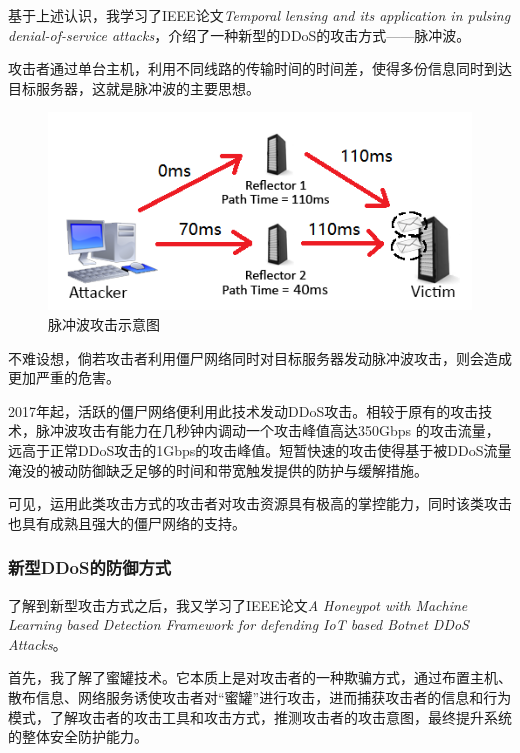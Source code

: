 \documentclass{article}
\begin{document}
基于上述认识，我学习了IEEE论文\emph{Temporal lensing and its application in pulsing denial-of-service attacks}\cite{ref7}，介绍了一种新型的DDoS的攻击方式——脉冲波。

攻击者通过单台主机，利用不同线路的传输时间的时间差，使得多份信息同时到达目标服务器，这就是脉冲波的主要思想。

\begin{figure}[h!]
    \centering
    \includegraphics[scale=0.6]{1}
    \caption{脉冲波攻击示意图}
    \label{fig:1}
\end{figure}

不难设想，倘若攻击者利用僵尸网络同时对目标服务器发动脉冲波攻击，则会造成更加严重的危害。

2017年起，活跃的僵尸网络便利用此技术发动DDoS攻击。相较于原有的攻击技术，脉冲波攻击有能力在几秒钟内调动一个攻击峰值高达350Gbps 的攻击流量，远高于正常DDoS攻击的1Gbps的攻击峰值。短暂快速的攻击使得基于被DDoS流量淹没的被动防御缺乏足够的时间和带宽触发提供的防护与缓解措施。

可见，运用此类攻击方式的攻击者对攻击资源具有极高的掌控能力，同时该类攻击也具有成熟且强大的僵尸网络的支持。

\subsubsection{新型DDoS的防御方式}

了解到新型攻击方式之后，我又学习了IEEE论文\emph{A Honeypot with Machine Learning based Detection Framework for defending IoT based Botnet DDoS Attacks}\cite{ref8}。

首先，我了解了蜜罐技术。它本质上是对攻击者的一种欺骗方式，通过布置主机、散布信息、网络服务诱使攻击者对“蜜罐”进行攻击，进而捕获攻击者的信息和行为模式，了解攻击者的攻击工具和攻击方式，推测攻击者的攻击意图，最终提升系统的整体安全防护能力。
\end{document}
